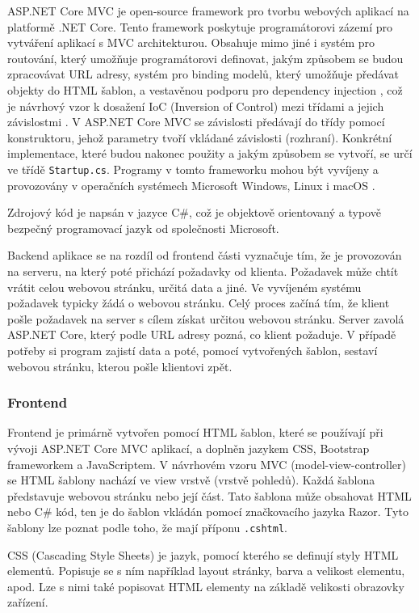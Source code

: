 ASP.NET Core MVC je open-source framework pro tvorbu webových aplikací na platformě .NET Core. Tento framework poskytuje programátorovi zázemí pro vytváření aplikací s MVC architekturou. Obsahuje mimo jiné i systém pro routování, který umožňuje programátorovi definovat, jakým způsobem se budou zpracovávat URL adresy, systém pro binding modelů, který umožňuje předávat objekty do HTML šablon, a vestavěnou podporu pro dependency injection \cite{net-mvc-overview}, což je návrhový vzor k dosažení IoC (Inversion of Control) mezi třídami a jejich závislostmi \cite{net-dependency-injection}. V ASP.NET Core MVC se závislosti předávají do třídy pomocí konstruktoru, jehož parametry tvoří vkládané závislosti (rozhraní). Konkrétní implementace, které budou nakonec použity a jakým způsobem se vytvoří, se určí ve třídě \texttt{Startup.cs}. Programy v tomto frameworku mohou být vyvíjeny a provozovány v operačních systémech Microsoft Windows, Linux i macOS \cite{net-core-introduction}.

Zdrojový kód je napsán v jazyce C\#, což je objektově orientovaný a typově bezpečný programovací jazyk od společnosti Microsoft.

Backend aplikace se na rozdíl od frontend části vyznačuje tím, že je provozován na serveru, na který poté přichází požadavky od klienta. Požadavek může chtít vrátit celou webovou stránku, určitá data a jiné. Ve vyvíjeném systému požadavek typicky žádá o webovou stránku. Celý proces začíná tím, že klient pošle požadavek na server s cílem získat určitou webovou stránku. Server zavolá ASP.NET Core, který podle URL adresy pozná, co klient požaduje. V případě potřeby si program zajistí data a poté, pomocí vytvořených šablon, sestaví webovou stránku, kterou pošle klientovi zpět.

\subsubsection{Frontend}
Frontend je primárně vytvořen pomocí HTML šablon, které se používají při vývoji ASP.NET Core MVC aplikací, a doplněn jazykem CSS, Bootstrap frameworkem a JavaScriptem. 
V návrhovém vzoru MVC (model-view-controller) se HTML šablony nachází ve view vrstvě (vrstvě pohledů). Každá šablona představuje webovou stránku nebo její část. Tato šablona může obsahovat HTML nebo C\# kód, ten je do šablon vkládán pomocí značkovacího jazyka Razor. Tyto šablony lze poznat podle toho, že mají příponu \texttt{.cshtml}. \cite{net-views}

CSS (Cascading Style Sheets) je jazyk, pomocí kterého se definují styly HTML elementů. Popisuje se s ním například layout stránky, barva a velikost elementu, apod. Lze s nimi také popisovat HTML elementy na základě velikosti obrazovky zařízení. \cite{css}

